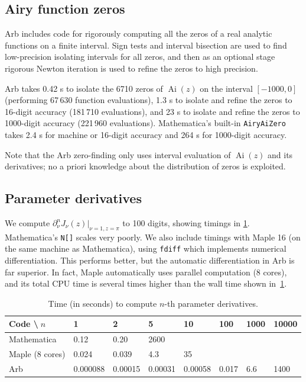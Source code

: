 \documentclass[review,nohypdvips]{siamart0216}
\begin{document}
\subsection{Airy function zeros}

Arb includes code for rigorously computing
all the zeros of a real analytic functions on a finite interval.
Sign tests and interval bisection are used
to find low-precision isolating intervals for all zeros,
and then as an optional stage rigorous Newton iteration
is used to refine the zeros to high precision.

Arb takes 0.42 s to isolate the 6710 zeros of
$\operatorname{Ai}(z)$ on the interval $[-1000,0]$
(performing 67\,630 function evaluations),
1.3 s to isolate and refine the zeros to 16-digit accuracy (181\,710 evaluations),
and 23 s to isolate and refine the zeros to 1000-digit accuracy
(221\,960 evaluations).
Mathematica's built-in \texttt{AiryAiZero} takes 2.4 s for
machine or 16-digit accuracy and 264 s for 1000-digit accuracy.

Note that the Arb zero-finding only uses interval evaluation
of $\operatorname{Ai}(z)$ and its derivatives; 
no a priori knowledge about the distribution of zeros
is exploited.

\subsection{Parameter derivatives}

We compute $\partial_{\nu}^n J_{\nu}(z) \vert_{\nu=1,z=\pi}$ to 100 digits,
showing timings in \cref{tab:paramderiv}.
Mathematica's \texttt{N[]} scales very poorly.
We also include timings with Maple 16 (on the same machine as Mathematica),
using \texttt{fdiff} which implements numerical differentiation.
This performs better, but the automatic
differentiation in Arb is far superior.
In fact, Maple automatically uses parallel computation (8 cores), and its total CPU
time is several times higher than the wall time shown in~\cref{tab:paramderiv}.

\begin{table}[h!]
\renewcommand{\arraystretch}{1.1}
\setlength{\tabcolsep}{.4em}
\begin{center}
\caption{Time (in seconds) to compute $n$-th parameter derivatives.}
\begin{small}
\begin{tabular}{l | l l l l l l l}
Code \textbackslash $\;n$      & 1 & 2 & 5 & 10 & 100 & 1000 & 10000  \\ \hline
Mathematica     & 0.12     & 0.20    & 2600    &         &       &     &        \\
Maple (8 cores) & 0.024    & 0.039   & 4.3     & 35       &      &     &        \\
Arb             & 0.000088 & 0.00015 & 0.00031 & 0.00058 & 0.017 & 6.6 & 1400
\end{tabular}
\end{small}
\label{tab:paramderiv}
\end{center}
\end{table}
\end{document}
